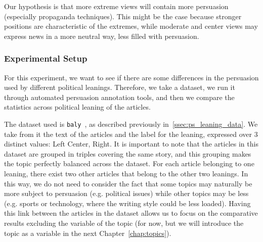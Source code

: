 

Our hypothesis is that more extreme views will contain more persuasion (especially propaganda techniques).
This might be the case because stronger positions are characteristic of the extremes, while moderate and center views may express news in a more neutral way, less filled with persuasion.

\subsubsection{Experimental Setup}

For this experiment, we want to see if there are some differences in the persuasion used by different political leanings. Therefore, we take a dataset, we run it through automated persuasion annotation tools, and then we compare the statistics across political leaning of the articles.

The dataset used is \texttt{baly}~\citep{baly2020we}, as described previously in~\ref{ssec:ps_leaning_data}.
We take from it the text of the articles and the label for the leaning, expressed over 3 distinct values: Left Center, Right.
It is important to note that the articles in this dataset are grouped in triples covering the same story, and this grouping makes the topic perfectly balanced across the dataset. For each article belonging to one leaning, there exist two other articles that belong to the other two leanings.
In this way, we do not need to consider the fact that some topics may naturally be more subject to persuasion (e.g. political issues) while other topics may be less (e.g. sports or technology, where the writing style could be less loaded).
Having this link between the articles in the dataset allows us to focus on the comparative results excluding the variable of the topic (for now, but we will introduce the topic as a variable in the next Chapter~\ref{chap:topics}).

